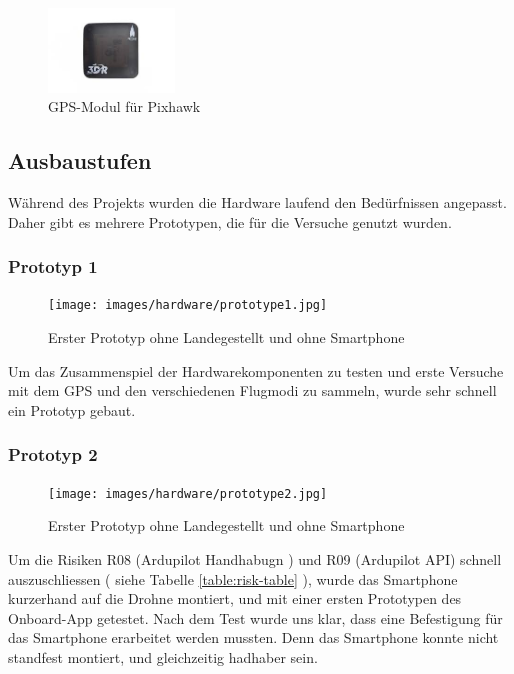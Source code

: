 \begin{figure}[h]
\centering
\includegraphics[width=0.3\textwidth] {images/hardware/gps-module.jpg} 
\caption{GPS-Modul für Pixhawk}
\label{fig:gps-module}
\end{figure}

\subsection{Ausbaustufen}

Während des Projekts wurden die Hardware laufend den Bedürfnissen angepasst. Daher gibt es mehrere Prototypen, die für die Versuche genutzt wurden.

\subsubsection{Prototyp 1}

\begin{figure}[H]
\centering
\texttt{[image: images/hardware/prototype1.jpg]}
\caption{Erster Prototyp ohne Landegestellt und ohne Smartphone}
\label{fig:prototyp-1}
\end{figure}

Um das Zusammenspiel der Hardwarekomponenten zu testen und erste Versuche mit dem GPS und den verschiedenen Flugmodi zu sammeln, wurde sehr schnell ein Prototyp gebaut.

\subsubsection{Prototyp 2}

\begin{figure}[H]
\centering
\texttt{[image: images/hardware/prototype2.jpg]}
\caption{Erster Prototyp ohne Landegestellt und ohne Smartphone}
\label{fig:prototyp-2}
\end{figure}

Um die Risiken R08 (Ardupilot Handhabugn ) und R09 (Ardupilot API) schnell auszuschliessen ( siehe Tabelle \ref{table:risk-table} ), wurde das Smartphone kurzerhand auf die Drohne montiert, und mit einer ersten 
Prototypen des Onboard-App getestet. 
Nach dem Test wurde uns klar, dass eine Befestigung für das Smartphone erarbeitet werden mussten. 
Denn das Smartphone konnte nicht standfest montiert, und gleichzeitig hadhaber sein. 


